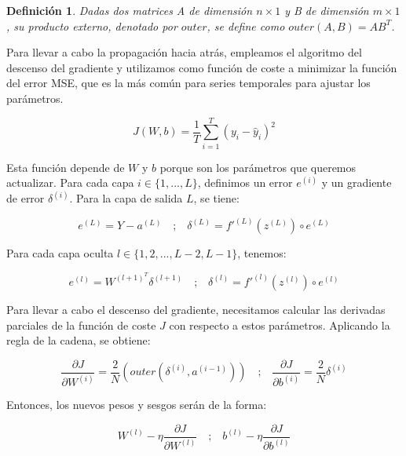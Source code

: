 \documentclass[12pt,twoside]{article}
\newtheorem{definition}[theorem]{Definición}
\begin{document}
\begin{definition}
Dadas dos matrices A de dimensión $n \times 1$ y B de dimensión $m \times 1$, su producto externo, denotado por $outer$, se define como $outer(A,B) = AB^T$.
\end{definition}

Para llevar a cabo la propagación hacia atrás, empleamos el algoritmo del descenso del gradiente y utilizamos como función de coste a minimizar la función del error MSE, que es la más común para series temporales para ajustar los parámetros.

\begin{equation}
J(W, b) = \frac{1}{T} \sum_{i=1}^{T} (y_i - \hat{y}_i)^2
\end{equation}

Esta función depende de $W$ y $b$ porque son los parámetros que queremos actualizar. Para cada capa $i \in \{1, ..., L\}$, definimos un error $e^{(i)}$ y un gradiente de error $\delta^{(i)}$. Para la capa de salida $L$, se tiene:

\begin{equation}
e^{(L)} = Y - a^{(L)}
\quad \text{;} \quad
\delta^{(L)} = f'^{(L)}(z^{(L)}) \circ e^{(L)}
\end{equation}

Para cada capa oculta $l \in \{1,2, ..., L-2, L-1\}$, tenemos:

\begin{equation}
e^{(l)} = W^{(l+1)^T} \delta^{(l+1)}
\quad \text{;} \quad
\delta^{(l)} = f'^{(l)}(z^{(l)}) \circ e^{(l)}
\end{equation}

Para llevar a cabo el descenso del gradiente, necesitamos calcular las derivadas parciales de la función de coste $J$ con respecto a estos parámetros. Aplicando la regla de la cadena, se obtiene: 

\begin{equation}
\frac{\partial J}{\partial W^{(i)}} = \frac{2}{N}\left(outer(\delta^{(i)}, a^{(i-1)})\right)
\quad \text{;} \quad
\frac{\partial J}{\partial b^{(i)}} = \frac{2}{N} \delta^{(i)}
\end{equation}

Entonces, los nuevos pesos y sesgos serán de la forma:

\begin{equation}
W^{(l)} - \eta\frac{\partial J}{\partial W^{(l)}}
\quad \text{;} \quad
b^{(l)} - \eta \frac{\partial J}{\partial b^{(l)}}
\end{equation}
\end{document}
